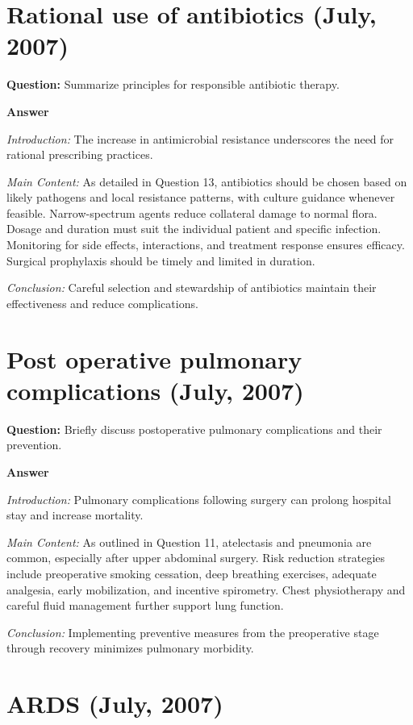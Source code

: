 \documentclass{article}
\begin{document}
\section{Rational use of antibiotics (July, 2007)}


\textbf{Question:} Summarize principles for responsible antibiotic therapy.

\textbf{Answer}

\emph{Introduction:} The increase in antimicrobial resistance underscores the need for rational prescribing practices.

\emph{Main Content:} As detailed in Question 13, antibiotics should be chosen based on likely pathogens and local resistance patterns, with culture guidance whenever feasible. Narrow-spectrum agents reduce collateral damage to normal flora. Dosage and duration must suit the individual patient and specific infection. Monitoring for side effects, interactions, and treatment response ensures efficacy. Surgical prophylaxis should be timely and limited in duration.

\emph{Conclusion:} Careful selection and stewardship of antibiotics maintain their effectiveness and reduce complications.


\section{Post operative pulmonary complications (July, 2007)}


\textbf{Question:} Briefly discuss postoperative pulmonary complications and their prevention.

\textbf{Answer}

\emph{Introduction:} Pulmonary complications following surgery can prolong hospital stay and increase mortality.

\emph{Main Content:} As outlined in Question 11, atelectasis and pneumonia are common, especially after upper abdominal surgery. Risk reduction strategies include preoperative smoking cessation, deep breathing exercises, adequate analgesia, early mobilization, and incentive spirometry. Chest physiotherapy and careful fluid management further support lung function.

\emph{Conclusion:} Implementing preventive measures from the preoperative stage through recovery minimizes pulmonary morbidity.


\section{ARDS (July, 2007)}
\end{document}
